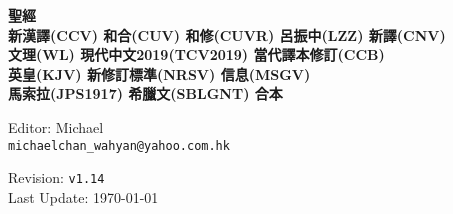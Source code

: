 \documentclass{book}
\author{
  Editor, Michael Chan\\
  \texttt{michaelchan\_wahyan@yahoo.com.hk}
}
\begin{document}
\clearpage
\newcommand\nbvspace[1][3]{\vspace*{\stretch{#1}}}
\newcommand\nbstretchyspace{\spaceskip0.5em plus 0.25em minus 0.25em}
\newcommand{\nbtitlestretch}{\spaceskip0.6em}
\pagestyle{empty}
\begin{center}
\bfseries
\nbvspace[1]
\Huge
{%
\Large
\textbf{聖經 \\
       新漢譯(CCV) 和合(CUV) 和修(CUVR) 呂振中(LZZ) 新譯(CNV) \\
       文理(WL) 現代中文2019(TCV2019) 當代譯本修訂(CCB) \\
       英皇(KJV) 新修訂標準(NRSV) 信息(MSGV) \\
       馬索拉(JPS1917) 希臘文(SBLGNT) 合本 \\
       }}

\nbvspace[1]

{\large
Editor: Michael\\
\texttt{michaelchan\_wahyan@yahoo.com.hk}
}

\nbvspace[1]

{\large
Revision: \texttt{v1.14}\\
Last Update: \today
}


\vfill
\begin{tikzpicture}
\end{tikzpicture}
\vfill

\end{center}

\newpage

\setcounter{tocdepth}{0}
\dominitoc
\begin{multicols}{3}
\tableofcontents
\end{multicols}

\large

\end{document}
